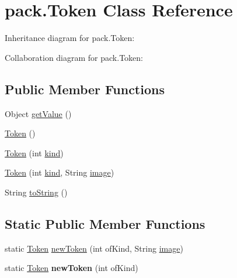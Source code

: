 \hypertarget{classpack_1_1_token}{}\section{pack.\+Token Class Reference}
\label{classpack_1_1_token}


Inheritance diagram for pack.\+Token\+:


Collaboration diagram for pack.\+Token\+:
\subsection*{Public Member Functions}
\begin{DoxyCompactItemize}
\item 
Object \hyperlink{classpack_1_1_token_ac305f24cb6fbdef23f67ba8c2e3ae04e}{get\+Value} ()
\item 
\hyperlink{classpack_1_1_token_a4ecfec365d6c5c6ae5200941cae55f66}{Token} ()
\item 
\hyperlink{classpack_1_1_token_a2b695dd62c074593e61d2807ee9025c4}{Token} (int \hyperlink{classpack_1_1_token_a2556cfc62b26093ed5ca01f8d183ff28}{kind})
\item 
\hyperlink{classpack_1_1_token_a7013555b7b9f14f339b383840ed80127}{Token} (int \hyperlink{classpack_1_1_token_a2556cfc62b26093ed5ca01f8d183ff28}{kind}, String \hyperlink{classpack_1_1_token_a2c9f5859a8bc0fc9c72aaff47620e755}{image})
\item 
String \hyperlink{classpack_1_1_token_aea326d2e5e0be4132465e052794d7eff}{to\+String} ()
\end{DoxyCompactItemize}
\subsection*{Static Public Member Functions}
\begin{DoxyCompactItemize}
\item 
static \hyperlink{classpack_1_1_token}{Token} \hyperlink{classpack_1_1_token_aa51ceb7660dfb6df5bc48ecae53b8ecf}{new\+Token} (int of\+Kind, String \hyperlink{classpack_1_1_token_a2c9f5859a8bc0fc9c72aaff47620e755}{image})
\item 
static \hyperlink{classpack_1_1_token}{Token} {\bfseries new\+Token} (int of\+Kind)\hypertarget{classpack_1_1_token_a09c75bac5fb861fefc8d8991bb6997d5}{}\label{classpack_1_1_token_a09c75bac5fb861fefc8d8991bb6997d5}

\end{DoxyCompactItemize}
